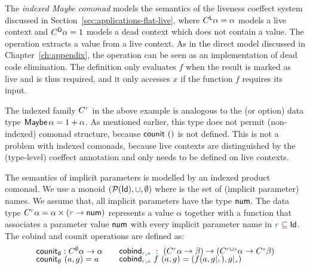 \noindent
The \emph{indexed Maybe comonad} models the semantics of the liveness coeffect system discussed in
Section~\ref{sec:applications-flat-live}, where $C^{\textnormal{\sffamily L}}\alpha = \alpha$ models a live context
and $C^{\textnormal{\sffamily D}}\alpha=1$ models a dead context which does not contain a value. The 
operation extracts a value from a live context. As in the direct model discussed in Chapter~\ref{ch:appendix},
the  operation can be seen as an implementation of dead code elimination. The definition
only evaluates $f$ when the result is marked as live and is thus required, and it only accesses $x$ if
the function $f$ requires its input.

The indexed family $\ctyp{\cclrd{r}}{}$ in the above example is analogous to the 
(or option) data type $\textnormal{\sffamily Maybe}\,\alpha = 1 + \alpha$. As mentioned earlier, this type does not
permit (non-indexed) comonad structure, because $\textnormal{\sffamily counit}~()$ is not defined. This is not a
problem with indexed comonads, because live contexts are distinguished by the (type-level) coeffect
annotation and  only needs to be defined on live contexts.

\begin{example}
The semantics of implicit parameters is modelled by an indexed product comonad. We use a monoid
$(\mathcal{P}(\textnormal{\sffamily Id}), \cup, \emptyset)$ where  is the set of (implicit parameter) names.
We assume that, all implicit parameters have the type $\textnormal{\sffamily num}$. The data type $\ctyp{\cclrd{r}}{\alpha}
= \alpha \times (\cclrd{r} \rightarrow \ident{num})$ represents a value $\alpha$ together with a function that
associates a parameter value $\textnormal{\sffamily num}$ with every implicit parameter name in $\cclrd{r} \subseteq \ident{Id}$.
The cobind and counit operations are defined as:
%
\begin{equation*}
\begin{array}{l}
\ident{counit}_{\emptyset} : \ctyp{\emptyset}{\alpha} \rightarrow \alpha \\[-0.25em]
\ident{counit}_{\emptyset}~(a, g) = a\\[0.5em]
\end{array}
\quad
\begin{array}{l}
\ident{cobind}_{\cclrd{r},\cclrd{s}} ~:~ (\ctyp{\cclrd{r}}{\alpha} \rightarrow \beta)
    \rightarrow (\ctyp{\cclrd{r}\cup\cclrd{s}}{\alpha} \rightarrow \ctyp{\cclrd{s}}{\beta})\\[-0.25em]
\ident{cobind}_{\cclrd{r},\cclrd{s}}~f~(a,g) = (f(a,\restr{g}{\cclrd{r}}), \restr{g}{\cclrd{s}})\\[0.5em]
\end{array}
\end{equation*}
\end{example}

